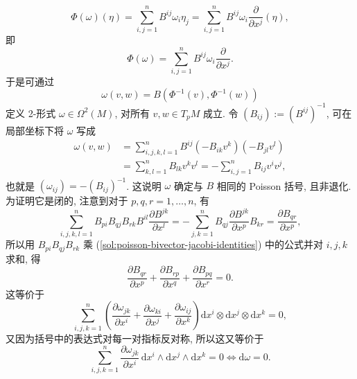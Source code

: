 \begin{description}[font=\normalfont,leftmargin=2em,labelwidth=1.5em]
\begin{enumerate}[label=(\alph*),ref=\alph*,leftmargin=*]
\[
  \Phi(\omega)(\eta)=\sum_{i,j=1}^n B^{ij}\omega_i\eta_j
      =\sum_{i,j=1}^n B^{ij}\omega_i\frac{\partial}{\partial x^j}(\eta),
\]
即
\[
  \Phi(\omega)=\sum_{i,j=1}^n B^{ij}\omega_i\frac{\partial}{\partial x^j}.
\]
于是可通过
\[
  \omega(v,w)=B(\Phi^{-1}(v),\Phi^{-1}(w))
\]
定义 2-形式 $\omega\in\Omega^2(M)$, 对所有 $v,w\in T_pM$ 成立. 令 $(B_{ij}):=(B^{ij})^{-1}$, 可在局部坐标下将 $\omega$ 写成
\begin{align*}
  \omega(v,w)
   &=\sum_{i,j,k,l=1}^n B^{ij}(-B_{ik}v^k)(-B_{jl}v^l)\\
   &=\sum_{k,l=1}^nB_{lk}v^kv^l=-\sum_{i,j=1}^n B_{ij}v^iv^j,
\end{align*}
也就是 $(\omega_{ij})=-(B_{ij})^{-1}$. 这说明 $\omega$ 确定与 $B$ 相同的 Poisson 括号, 且非退化. 为证明它是闭的, 注意到对于 $p,q,r=1,\ldots,n$, 有
\[
  \sum_{i,j,k,l=1}^n B_{pi}B_{qj}B_{rk}B^{il}\frac{\partial B^{jk}}{\partial x^l}
    =-\sum_{j,k=1}^n B_{qj}\frac{\partial B^{jk}}{\partial x^p}B_{kr}
    =\frac{\partial B_{qr}}{\partial x^p},
\]
所以用 $B_{pi}B_{qj}B_{rk}$ 乘 (\ref{sol:poisson-bivector-jacobi-identities}) 中的公式并对 $i,j,k$ 求和, 得
\[
  \frac{\partial B_{qr}}{\partial x^p}
      +\frac{\partial B_{rp}}{\partial x^q}
      +\frac{\partial B_{pq}}{\partial x^r}=0.
\]
这等价于
\[
  \sum_{i,j,k=1}^n\left(\frac{\partial\omega_{jk}}{\partial x^i}
       +\frac{\partial\omega_{ki}}{\partial x^j}
       +\frac{\partial\omega_{ij}}{\partial x^k}\right)
           \mathrm{d}x^i\otimes\mathrm{d}x^j\otimes\mathrm{d}x^k=0,
\]
又因为括号中的表达式对每一对指标反对称, 所以这又等价于
\[
  \sum_{i,j,k=1}^n\frac{\partial\omega_{jk}}{\partial x^i}
    \,\mathrm{d}x^i\wedge\mathrm{d}x^j\wedge\mathrm{d}x^k=0
    \iff\mathrm{d}\omega=0.
\]
\end{enumerate}


\end{description}
